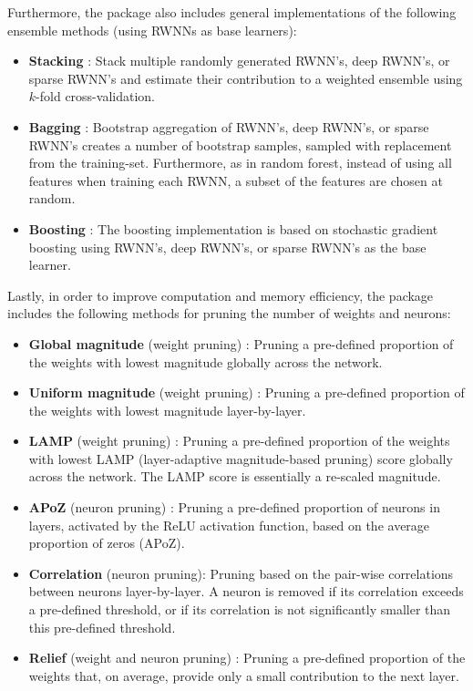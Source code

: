\documentclass[
]{jss}
\providecommand{\tightlist}{%
  \setlength{\itemsep}{0pt}\setlength{\parskip}{0pt}}
\begin{document}
Furthermore, the  package also includes general
implementations of the following ensemble methods (using RWNNs as base
learners):

\begin{itemize}
\tightlist
\item
  \textbf{Stacking} \citep{Wolpert1992, Breiman1996a}: Stack multiple
  randomly generated RWNN's, deep RWNN's, or sparse RWNN's and estimate
  their contribution to a weighted ensemble using \(k\)-fold
  cross-validation.
\item
  \textbf{Bagging} \citep{Breiman1996b, Breiman2001, Xin2021}: Bootstrap
  aggregation of RWNN's, deep RWNN's, or sparse RWNN's creates a number
  of bootstrap samples, sampled with replacement from the training-set.
  Furthermore, as in random forest, instead of using all features when
  training each RWNN, a subset of the features are chosen at random.
\item
  \textbf{Boosting} \citep{Friedman2001}: The boosting implementation is
  based on stochastic gradient boosting using RWNN's, deep RWNN's, or
  sparse RWNN's as the base learner.
\end{itemize}

Lastly, in order to improve computation and memory efficiency, the
 package includes the following methods for pruning the number
of weights and neurons:

\begin{itemize}
\tightlist
\item
  \textbf{Global magnitude} (weight pruning)
  \citep{han2016, morcos2019}: Pruning a pre-defined proportion of the
  weights with lowest magnitude globally across the network.
\item
  \textbf{Uniform magnitude} (weight pruning)
  \citep{han2016, morcos2019}: Pruning a pre-defined proportion of the
  weights with lowest magnitude layer-by-layer.
\item
  \textbf{LAMP} (weight pruning) \citep{Lee2021}: Pruning a pre-defined
  proportion of the weights with lowest LAMP (layer-adaptive
  magnitude-based pruning) score globally across the network. The LAMP
  score is essentially a re-scaled magnitude.
\item
  \textbf{APoZ} (neuron pruning) \citep{hu2016}: Pruning a pre-defined
  proportion of neurons in layers, activated by the ReLU activation
  function, based on the average proportion of zeros (APoZ).
\item
  \textbf{Correlation} (neuron pruning): Pruning based on the pair-wise
  correlations between neurons layer-by-layer. A neuron is removed if
  its correlation exceeds a pre-defined threshold, or if its correlation
  is not significantly smaller than this pre-defined threshold.
\item
  \textbf{Relief} (weight and neuron pruning) \citep{Dekhovich2024}:
  Pruning a pre-defined proportion of the weights that, on average,
  provide only a small contribution to the next layer.
\end{itemize}
\end{document}
